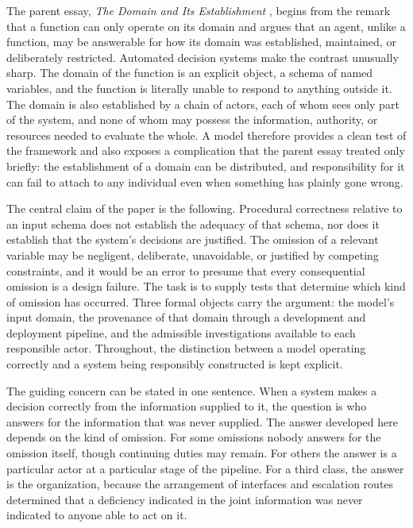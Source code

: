 \documentclass[11pt]{article}
\theoremstyle{plain}
\theoremstyle{definition}
\begin{document}
The parent essay, \emph{The Domain and Its Establishment} \cite{flyxion2026domain}, begins from the remark that a function can only operate on its domain and argues that an agent, unlike a function, may be answerable for how its domain was established, maintained, or deliberately restricted. Automated decision systems make the contrast unusually sharp. The domain of the function is an explicit object, a schema of named variables, and the function is literally unable to respond to anything outside it. The domain is also established by a chain of actors, each of whom sees only part of the system, and none of whom may possess the information, authority, or resources needed to evaluate the whole. A model therefore provides a clean test of the framework and also exposes a complication that the parent essay treated only briefly: the establishment of a domain can be distributed, and responsibility for it can fail to attach to any individual even when something has plainly gone wrong.

The central claim of the paper is the following. Procedural correctness relative to an input schema does not establish the adequacy of that schema, nor does it establish that the system's decisions are justified. The omission of a relevant variable may be negligent, deliberate, unavoidable, or justified by competing constraints, and it would be an error to presume that every consequential omission is a design failure. The task is to supply tests that determine which kind of omission has occurred. Three formal objects carry the argument: the model's input domain, the provenance of that domain through a development and deployment pipeline, and the admissible investigations available to each responsible actor. Throughout, the distinction between a model operating correctly and a system being responsibly constructed is kept explicit.

The guiding concern can be stated in one sentence. When a system makes a decision correctly from the information supplied to it, the question is who answers for the information that was never supplied. The answer developed here depends on the kind of omission. For some omissions nobody answers for the omission itself, though continuing duties may remain. For others the answer is a particular actor at a particular stage of the pipeline. For a third class, the answer is the organization, because the arrangement of interfaces and escalation routes determined that a deficiency indicated in the joint information was never indicated to anyone able to act on it.
\end{document}
